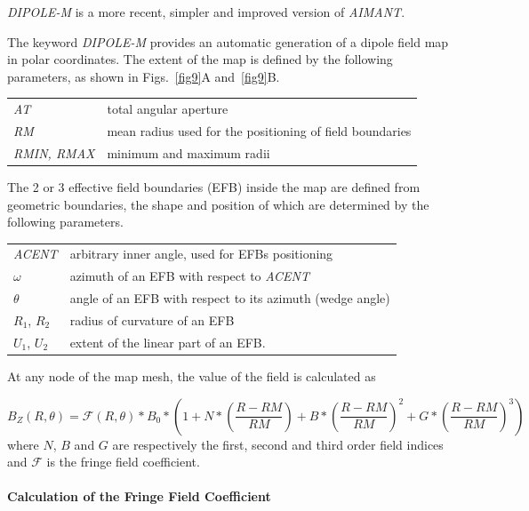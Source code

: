 \noindent\textsl{DIPOLE-M} is a more recent, simpler and improved version of 
\textsl{AIMANT}.  
\bigskip

\noindent The keyword \textsl{DIPOLE-M} provides an automatic generation of a dipole 
field map in polar coordinates. The extent of the map is defined by the 
following parameters, as shown in Figs.~\ref{fig9}A and~\ref{fig9}B.
\bigskip

 \begin{tabular}{>{\sl}l!{~:}l}
	 AT &  total angular aperture\\
	 RM & mean radius used for the positioning of field boundaries\\
	 RMIN, RMAX
	    &  minimum and maximum radii 
 \end{tabular}
\bigskip
 
\noindent The 2 or 3 effective field boundaries (EFB) inside the map are
defined from geometric boundaries, the shape and position of which are determined by the 
following parameters. 
\bigskip

\begin{tabular}{l!{~:}l}
	 \textsl{ACENT} 
	    & arbitrary inner angle, used for EFBs positioning  \\
	$\omega$ &  azimuth of an EFB with respect to  \textsl{ACENT}\\
	$\theta$ & angle of an EFB with respect to its azimuth (wedge angle)\\ 
	$R_1$, $R_2$  &  radius of curvature of an EFB\\
	$U_1$, $U_2$  &  extent of the linear part of an EFB. 
\end{tabular}
\bigskip


\noindent At  any node  of the map mesh, the value of the field is calculated as 

 \begin{equation}
	 B_Z(R,\theta)  =  \mathcal{F}(R,\theta)  \ast  B_0 \ast  
	      \left(1+N \ast  
	           \left( \dfrac{R-RM }{ RM}\right) 
	           + B \ast  \left(\dfrac{R-RM }{ RM} \right)^2 
	           + G \ast  \left(\dfrac{R-RM }{ RM} \right)^3 
	      \right) 
 	\label{eq3-3-1}
 \end{equation}
%
 where  $ N$, $B $ and $ G $ are  respectively  the first, second and
third order field indices and $ \mathcal{F}$ is the fringe field coefficient. 


\paragraph{Calculation of the Fringe Field Coefficient} 

